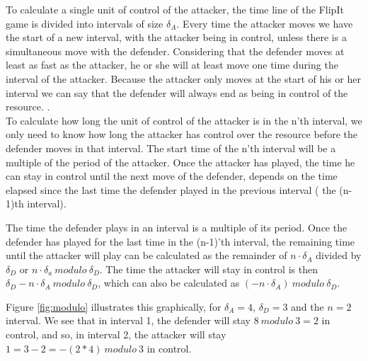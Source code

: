 To calculate a single unit of control of the attacker, the time line of the FlipIt game is divided into intervals of size $\delta_{A}$. Every time the attacker moves we have the start of a new interval, with the attacker being in control, unless there is a simultaneous move with the defender. 
Considering that the defender moves at least as fast as the attacker, he or she will at least move one time during the interval of the attacker. Because the attacker only moves at the start of his or her interval we can say that the defender will always end as being in control of the resource. 
. \\

To calculate how long the unit of control of the attacker is in the n'th interval, we only need to know how long the attacker has control over the resource before the defender moves in that interval. The start time of the n'th interval will be a multiple of the period of the attacker. Once the attacker has played, the time he can stay in control until the next move of the defender, depends on the time elapsed since the last time the defender played in the previous interval ( the (n-1)th interval).  

The time the defender plays in an interval is a multiple of its period. Once the defender has played for the last time in the (n-1)'th interval, the remaining time until the attacker will play can be calculated as the remainder of $n\cdot \delta_{A}$ divided by $\delta_{D}$ or $n \cdot \delta_{a}~modulo~ \delta_{D}$. The time the attacker will stay in control is then $\delta_{D}- n \cdot \delta_{A}~ modulo ~ \delta_{D}$, which can also be calculated as $( -n \cdot \delta_{A}) ~modulo~ \delta_{D}$.  

Figure \ref{fig:modulo} illustrates this graphically, for $\delta_{A}= 4$, $\delta_{D}=3$ and the $n=2$ interval. We see that in interval 1, the defender will stay $8 ~modulo~ 3 = 2$ in control, and so, in interval 2, the attacker will stay $1 = 3 - 2 = -(2*4) ~modulo~ 3$ in control.


